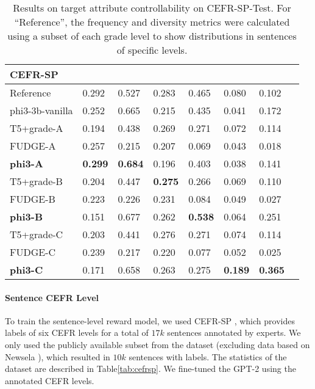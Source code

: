  \begin{table*}[t!]
    \small
    \centering
   \begin{adjustbox}{width=0.9\textwidth}
    \begin{tabular}{l L L L L L L L} \hline
     \textbf{CEFR-SP} &   &  &   &  &   &      \\ \hline
     Reference & 0.292 & 0.527 & 0.283 & 0.465  & 0.080 & 0.102  \\ 
      phi3-3b-vanilla &0.252 & 0.665 & 0.215 &0.435  &0.041 & 0.172  \\ \hline
       T5+grade-A & 0.194 & 0.438 & 0.269 & 0.271  &0.072 & 0.114  \\
       FUDGE-A & 0.257 & 0.215 & 0.207 & 0.069  &0.043 & 0.018 \\
       \textbf{phi3-A} & \textbf{0.299}  & \textbf{0.684} & 0.196 & 0.403  & 0.038 & 0.141 \\ \hline
       
       T5+grade-B & 0.204 & 0.447 & \textbf{0.275} & 0.266  &0.069 & 0.110  \\
       FUDGE-B & 0.223 & 0.226 & 0.231 & 0.084  &0.049 & 0.027 \\
        \textbf{phi3-B} & 0.151 & 0.677 & 0.262 & \textbf{0.538}  & 0.064 & 0.251 \\ \hline
        
      T5+grade-C & 0.203 & 0.441 &  0.276  &0.271 & 0.074 & 0.114 \\
       FUDGE-C  & 0.239 & 0.217 & 0.220 & 0.077  &0.052 & 0.025 \\
        \textbf{phi3-C} & 0.171 & 0.658 & 0.263 & 0.275  & \textbf{0.189}  & \textbf{0.365} \\ 
         \hline
    \end{tabular}
   \end{adjustbox}
    \caption{Results on target attribute controllability on CEFR-SP-Test. For ``Reference'', the frequency and diversity metrics were calculated using a subset of each grade level to show distributions in sentences of specific levels. }
    \label{tab:cefr1}
\end{table*}

\paragraph{Sentence CEFR Level} To train the sentence-level reward model,
we used CEFR-SP \cite{arase-etal-2022-cefr}, which provides labels of six CEFR levels for a total of $17k$ sentences annotated by experts.  
We only used the publicly available subset from the dataset (excluding data based on Newsela \cite{xu-etal-2015-problems}), which resulted in $10k$ sentences with labels.
The statistics of the dataset are described in Table\ref{tab:cefrsp}. %
We fine-tuned the  GPT-2 \cite{radford2019language} using the annotated CEFR levels. 


